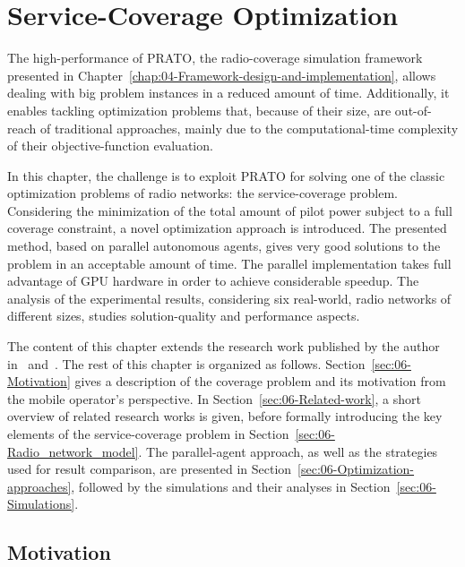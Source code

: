 
\chapter{Service-Coverage Optimization \label{chap:06-Experimental-evaluation-the-service-coverage-problem}}


\noindent The high-performance of PRATO, the radio-coverage simulation
framework presented in Chapter~\ref{chap:04-Framework-design-and-implementation},
allows dealing with big problem instances in a reduced amount of time.
Additionally, it enables tackling optimization problems that, because
of their size, are out-of-reach of traditional approaches, mainly
due to the computational-time complexity of their objective-function
evaluation.

In this chapter, the challenge is to exploit PRATO for solving one
of the classic optimization problems of radio networks: the service-coverage
problem. Considering the minimization of the total amount of pilot
power subject to a full coverage constraint, a novel optimization
approach is introduced. The presented method, based on parallel autonomous
agents, gives very good solutions to the problem in an acceptable
amount of time. The parallel implementation takes full advantage of
GPU hardware in order to achieve considerable speedup. The analysis
of the experimental results, considering six real-world, radio networks
of different sizes, studies solution-quality and performance aspects.

The content of this chapter extends the research work published by
the author in~\cite{Benedicic_Pilot.power.optimization:2010} and~\cite{Benedicic-A_GPU_based_parallel_agent_optimization_approach:2013}.
The rest of this chapter is organized as follows. Section~\ref{sec:06-Motivation}
gives a description of the coverage problem and its motivation from
the mobile operator's perspective. In Section~\ref{sec:06-Related-work},
a short overview of related research works is given, before formally
introducing the key elements of the service-coverage problem in Section~\ref{sec:06-Radio_network_model}.
The parallel-agent approach, as well as the strategies used for result
comparison, are presented in Section~\ref{sec:06-Optimization-approaches},
followed by the simulations and their analyses in Section~\ref{sec:06-Simulations}.


\section{Motivation \label{sec:06-Motivation}}

